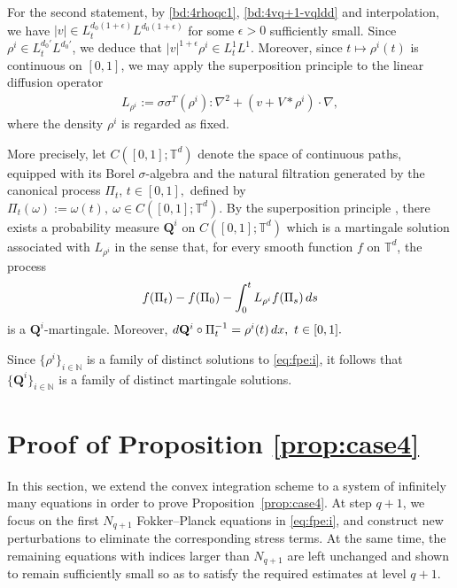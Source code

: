 \documentclass[10pt,a4paper]{amsart}
\numberwithin{equation}{section}
\def\dif{{\mathord{{\rm d}}}}
\def\dif{{\mathord{{\rm d}}}}
\begin{document}
 For the second statement,
by \eqref{bd:4rhoqc1}, \eqref{bd:4vq+1-vqldd} and interpolation, we have $|v| \in L_{t}^{d_0(1+\epsilon)}L^{d_0(1+\epsilon)}$ for some $\epsilon > 0$ sufficiently small. Since $\rho^i \in L_{t}^{d_0'}L^{d_0'}$, we deduce that $|v|^{1+\epsilon} \rho^i \in L_{t}^{1}L^{1}$.
Moreover, since
$
t\mapsto \rho^i(t)
$
is continuous on $[0,1]$, we may apply the superposition principle to the linear diffusion operator
\begin{align*}
L_{\rho^i}
:=
 \sigma\sigma^T(\rho^i):\nabla^2 
+
(v+V*\rho^i)\cdot\nabla,
\end{align*}
where the density $\rho^i$ is regarded as fixed.

More precisely, let $C([0,1];\mathbb{T}^d)$ denote the space of continuous paths, equipped with its Borel $\sigma$-algebra and the natural filtration generated by the canonical process
$
\Pi_t$, $t\in[0,1],
$
defined by
$
\Pi_t(\omega):=\omega(t),\ 
\omega\in C([0,1];\mathbb{T}^d).
$
By the superposition principle \cite[Section~7.2]{Tre14}, there exists a probability measure $\mathbf{Q}^i$ on $C([0,1];\mathbb{T}^d)$ which is a martingale solution associated with $L_{\rho^i}$ in the sense that, for every smooth function $f$ on $\mathbb{T}^d$, the process
\begin{align*}
f(\Pi_t)
-
f(\Pi_0)
-
\int_0^t
L_{\rho^i}f(\Pi_s)\,\dif s
\end{align*}
is a $\mathbf{Q}^i$-martingale. Moreover,
$
\dif\mathbf{Q}^i\circ \Pi_t^{-1}
=
\rho^i(t)\,\dif x,
\ 
t\in[0,1].
$

Since $\{\rho^i\}_{i\in\mathbb{N}}$ is a family of distinct solutions to \eqref{eq:fpe:i}, it follows that $\{\mathbf{Q}^i\}_{i\in\mathbb{N}}$ is a family of distinct martingale solutions.
 


\section{Proof of Proposition \ref{prop:case4}}\label{sec:convex}
In this section, we extend the convex integration scheme to a system of infinitely many equations in order to prove Proposition~\ref{prop:case4}. 
At step $q+1$, we focus on the first $N_{q+1}$ Fokker--Planck equations in \eqref{eq:fpe:i}, and construct new perturbations to eliminate the corresponding stress terms. 
At the same time, the remaining equations with indices larger than $N_{q+1}$ are left unchanged and shown to remain sufficiently small so as to satisfy the required estimates at level $q+1$.
\end{document}
